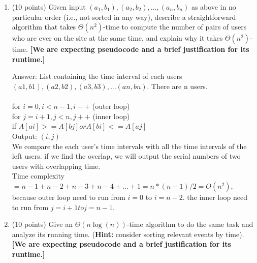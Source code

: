 \documentclass[12pt]{article}
\begin{document}
\begin{enumerate}
  \begin{enumerate}
    
    \item (10 points) Given input $(a_1, b_1), (a_2, b_2), \ldots, (a_n, b_n)$ as above in no particular order (i.e., not sorted in any way), describe a straightforward algorithm that takes $\Theta(n^2)$-time to compute the number of pairs of users who are ever on the site at the same time, and explain why it takes $\Theta(n^2)$-time.
    \textbf{[We are expecting pseudocode and a brief justification for its runtime.]}
    
    {\color{blue}Answer:
    \: List containing the time interval of each users {$(a1,b1),(a2, b2), (a3,b3), ... (an,bn)$}. There are n users.
    \\
    \\ for $i = 0, i < n-1, i++$ (outer loop)
    \\ for $j= i+1, j < n, j++$ (inner loop)
    \\ if $ A[ai] >= A[bj] or A[bi] <= A[aj]$
    \\Output: $(i,j)$
    \\We compare the each user's time intervals with all the time intervals of the left users. if we find the overlap, we will output the serial numbers of two users with overlapping time.
    \\Time complexity $ = n-1+ n-2 +n-3 + n-4 +...+ 1 = n*(n-1)/2 = O(n^2),$ because outer loop need to run from $i=0$ to $i= n-2$. the inner loop need to run from $j = i+1 to j= n-1.$
    }
        
    \item (10 points) Give an $\Theta(n \log(n))$-time algorithm to do the same task and analyze its running time. (\textbf{Hint:} consider sorting relevant events by time).
    \textbf{[We are expecting pseudocode and a brief justification for its runtime.]}
    

\end{enumerate}
\end{enumerate}
\end{document}
